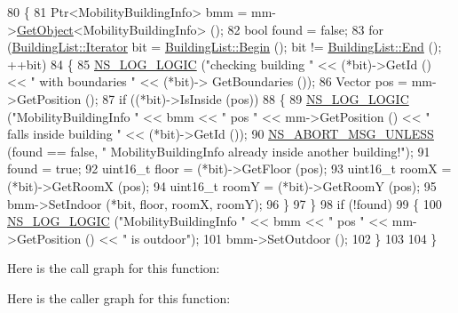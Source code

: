 \begin{DoxyCode}
80 \{
81   Ptr<MobilityBuildingInfo> bmm = mm->\hyperlink{classns3_1_1Object_a13e18c00017096c8381eb651d5bd0783}{GetObject}<MobilityBuildingInfo> ();
82   \textcolor{keywordtype}{bool} found = \textcolor{keyword}{false};
83   \textcolor{keywordflow}{for} (\hyperlink{classns3_1_1BuildingList_a84957ecea4b4343f676da0e96f2c8130}{BuildingList::Iterator} bit = \hyperlink{classns3_1_1BuildingList_adbb122872e11541e930f0a3afa70a479}{BuildingList::Begin} (); bit !=
       \hyperlink{classns3_1_1BuildingList_abc6b941dbb194efb9f00352cc6b3db65}{BuildingList::End} (); ++bit)
84     \{
85       \hyperlink{group__logging_ga88acd260151caf2db9c0fc84997f45ce}{NS\_LOG\_LOGIC} (\textcolor{stringliteral}{"checking building "} << (*bit)->GetId () << \textcolor{stringliteral}{" with boundaries "} << (*bit)->
      GetBoundaries ());
86       Vector pos = mm->GetPosition ();
87       \textcolor{keywordflow}{if} ((*bit)->IsInside (pos))
88         \{
89           \hyperlink{group__logging_ga88acd260151caf2db9c0fc84997f45ce}{NS\_LOG\_LOGIC} (\textcolor{stringliteral}{"MobilityBuildingInfo "} << bmm << \textcolor{stringliteral}{" pos "} << mm->GetPosition () << \textcolor{stringliteral}{"
       falls inside building "} << (*bit)->GetId ());
90           \hyperlink{group__fatal_ga0bd3f62c55e7347ff814572f3aaa3864}{NS\_ABORT\_MSG\_UNLESS} (found == \textcolor{keyword}{false}, \textcolor{stringliteral}{" MobilityBuildingInfo already inside
       another building!"});                
91           found = \textcolor{keyword}{true};
92           uint16\_t floor = (*bit)->GetFloor (pos);
93           uint16\_t roomX = (*bit)->GetRoomX (pos);
94           uint16\_t roomY = (*bit)->GetRoomY (pos);         
95           bmm->SetIndoor (*bit, floor, roomX, roomY);         
96         \}                         
97     \}
98   \textcolor{keywordflow}{if} (!found)
99     \{
100       \hyperlink{group__logging_ga88acd260151caf2db9c0fc84997f45ce}{NS\_LOG\_LOGIC} (\textcolor{stringliteral}{"MobilityBuildingInfo "} << bmm << \textcolor{stringliteral}{" pos "} << mm->GetPosition ()  << \textcolor{stringliteral}{" is
       outdoor"});
101       bmm->SetOutdoor ();
102     \}
103 
104 \}
\end{DoxyCode}


Here is the call graph for this function\+:




Here is the caller graph for this function\+:



